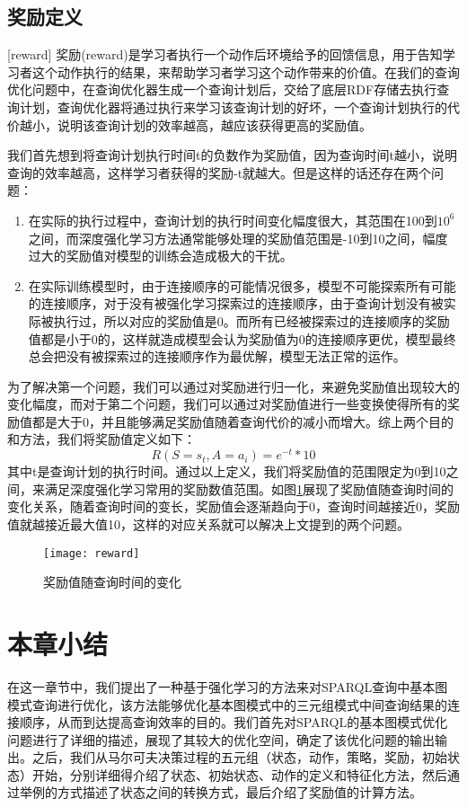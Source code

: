 \subsection{奖励定义}[reward]
奖励(reward)是学习者执行一个动作后环境给予的回馈信息，用于告知学习者这个动作执行的结果，来帮助学习者学习这个动作带来的价值。在我们的查询优化问题中，在查询优化器生成一个查询计划后，交给了底层RDF存储去执行查询计划，查询优化器将通过执行来学习该查询计划的好坏，一个查询计划执行的代价越小，说明该查询计划的效率越高，越应该获得更高的奖励值。

我们首先想到将查询计划执行时间t的负数作为奖励值，因为查询时间t越小，说明查询的效率越高，这样学习者获得的奖励-t就越大。但是这样的话还存在两个问题：
\begin{enumerate}
    \item 在实际的执行过程中，查询计划的执行时间变化幅度很大，其范围在100到$10^6$之间，而深度强化学习方法通常能够处理的奖励值范围是-10到10之间，幅度过大的奖励值对模型的训练会造成极大的干扰。
    \item 在实际训练模型时，由于连接顺序的可能情况很多，模型不可能探索所有可能的连接顺序，对于没有被强化学习探索过的连接顺序，由于查询计划没有被实际被执行过，所以对应的奖励值是0。而所有已经被探索过的连接顺序的奖励值都是小于0的，这样就造成模型会认为奖励值为0的连接顺序更优，模型最终总会把没有被探索过的连接顺序作为最优解，模型无法正常的运作。
\end{enumerate}

为了解决第一个问题，我们可以通过对奖励进行归一化，来避免奖励值出现较大的变化幅度，而对于第二个问题，我们可以通过对奖励值进行一些变换使得所有的奖励值都是大于0，并且能够满足奖励值随着查询代价的减小而增大。综上两个目的和方法，我们将奖励值定义如下：
\begin{equation}
    R(S=s_t,A=a_i)=e^{-t}*10
\end{equation}
其中t是查询计划的执行时间。通过以上定义，我们将奖励值的范围限定为0到10之间，来满足深度强化学习常用的奖励数值范围。如图\ref{reward}展现了奖励值随查询时间的变化关系，随着查询时间的变长，奖励值会逐渐趋向于0，查询时间越接近0，奖励值就越接近最大值10，这样的对应关系就可以解决上文提到的两个问题。
\begin{figure}[h]
    \centering
    \texttt{[image: reward]}
    \caption{奖励值随查询时间的变化}
    \label{reward}
\end{figure}
\section{本章小结}
在这一章节中，我们提出了一种基于强化学习的方法来对SPARQL查询中基本图模式查询进行优化，该方法能够优化基本图模式中的三元组模式中间查询结果的连接顺序，从而到达提高查询效率的目的。我们首先对SPARQL的基本图模式优化问题进行了详细的描述，展现了其较大的优化空间，确定了该优化问题的输出输出。之后，我们从马尔可夫决策过程的五元组（状态，动作，策略，奖励，初始状态）开始，分别详细得介绍了状态、初始状态、动作的定义和特征化方法，然后通过举例的方式描述了状态之间的转换方式，最后介绍了奖励值的计算方法。

